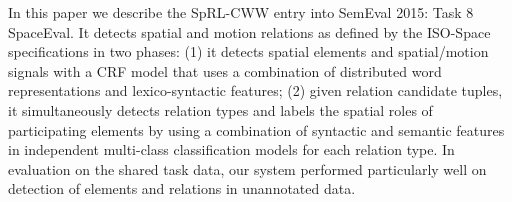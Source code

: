 In this paper we describe the SpRL-CWW entry into SemEval 2015: Task 8 SpaceEval. It detects spatial and motion relations as defined by the ISO-Space specifications in two phases: (1) it detects spatial elements and spatial/motion signals with a CRF model that uses a combination of distributed word representations and lexico-syntactic features; (2) given relation candidate tuples, it simultaneously detects relation types and labels the spatial roles of participating elements by using a combination of syntactic and semantic features in independent multi-class classification models for each relation type. In evaluation on the shared task data, our system performed particularly well on detection of elements and relations in unannotated data.
